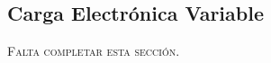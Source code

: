 \subsection{Carga Electrónica Variable}


{\Large\Bold\scshape Falta completar esta sección.}\\

\lipsum[1]\\

\lipsum[2]\\

\lipsum[3]\\